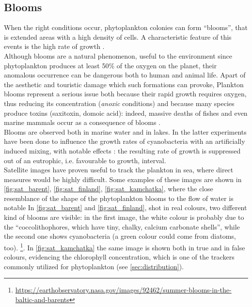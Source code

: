 \subsection{Blooms} \label{sec:ref_pla_blooms}
When the right conditions occur, phytoplankton colonies can form ``blooms'', that is extended areas with a high density of cells. A characteristic feature of this events is the high rate of growth \autocite{Taylor2011ShutdownBlooms}.\\
Although blooms are a natural phenomenon, useful to the environment since phytoplankton produces at least 50\% of the oxygen on the planet, their anomalous occurrence can be dangerous both to human and animal life. 
Apart of the aesthetic and touristic damage which such formations can provoke, Plankton blooms represent a serious issue both because their rapid growth requires oxygen, thus reducing its concentration (\textit{anoxic} conditions) and because many species produce toxins (saxitoxin, domoic acid): indeed, massive deaths of fishes and even marine mammals occur as a consequence of blooms \autocite[chapter 3]{Lalli1997}. \\
Blooms are observed both in marine water and in lakes. In the latter experiments have been done to influence the growth rates of cyanobacteria with an artificially induced mixing, with notable effects \autocite{Visser2016ArtificialReview}: the resulting rate of growth is suppressed out of an eutrophic, i.e. favourable to growth, interval.\\
Satellite images have proven useful to track the plankton in sea, where direct measures would be highly difficult. Some examples of these images are shown in \autoref{fig:sat_barent}, \autoref{fig:sat_finland}, \autoref{fig:sat_kamchatka}, where the close resemblance of the shape of the phytoplankton blooms to the flow of water is notable
In \autoref{fig:sat_barent} and \autoref{fig:sat_finland}, shot in real colours, two different kind of blooms are visible: in the first image, the white colour is probably due to the ``coccolithophores, which have tiny, chalky, calcium carbonate shells'', while the second one shows cyanobacteria (a green colour could come from diatoms, too).
\footnote{\url{https://earthobservatory.nasa.gov/images/92462/summer-blooms-in-the-baltic-and-barents}}. 
In \autoref{fig:sat_kamchatka} the same image is shown both in true and in false colours, evidencing the chlorophyll concentration, which is one of the trackers commonly utilized for phytoplankton (see \autoref{sec:distribution}).


